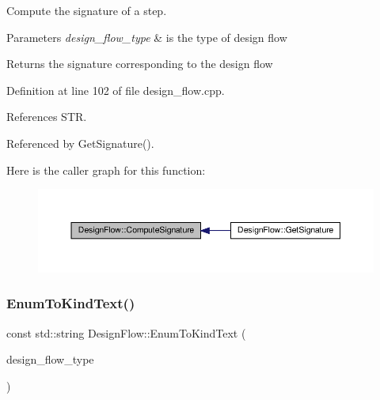 Compute the signature of a step. 


\begin{DoxyParams}{Parameters}
{\em design\+\_\+flow\+\_\+type} & is the type of design flow \\
\hline
\end{DoxyParams}
\begin{DoxyReturn}{Returns}
the signature corresponding to the design flow 
\end{DoxyReturn}


Definition at line 102 of file design\+\_\+flow.\+cpp.



References S\+TR.



Referenced by Get\+Signature().

Here is the caller graph for this function\+:
\nopagebreak
\begin{figure}[H]
\begin{center}
\leavevmode
\includegraphics[width=350pt]{d2/d61/classDesignFlow_ad4a2c9611b98f3d5108be5ad71a8de63_icgraph}
\end{center}
\end{figure}
\mbox{\label{classDesignFlow_ad561ebde784b2bd0afd84a526a19a836}} 
\subsubsection{\texorpdfstring{Enum\+To\+Kind\+Text()}{EnumToKindText()}}
{\footnotesize\ttfamily const std\+::string Design\+Flow\+::\+Enum\+To\+Kind\+Text (\begin{DoxyParamCaption}\item[{const \hyperlink{design__flow_8hpp_a0701ad2cbf08dc97b38caee3bbbff0c0}{Design\+Flow\+\_\+\+Type}}]{design\+\_\+flow\+\_\+type }\end{DoxyParamCaption})\hspace{0.3cm}{\ttfamily [static]}}




